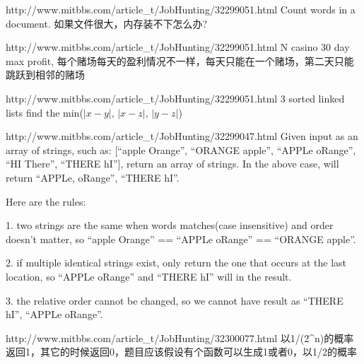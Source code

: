 \documentclass[a4paper]{article}
\begin{document}
\begin{CJK}{UTF8}{gbsn}
\begin{enumerate}
\begin{Q}[Apple]{http://www.mitbbs.com/article_t/JobHunting/32299051.html}
Count words in a document. 如果文件很大，内存装不下怎么办?
\end{Q}

\begin{Q}[Apple]{http://www.mitbbs.com/article_t/JobHunting/32299051.html}
N casino 30 day max profit, 每个赌场每天的盈利情况不一样，每天只能在一个赌场，第二天只能跳跃到相邻的赌场
\end{Q}

\begin{Q}[Apple]{http://www.mitbbs.com/article_t/JobHunting/32299051.html}
3 sorted linked lists find the min($|x-y|$, $|x-z|$, $|y-z|$)
\end{Q}

\begin{Q}{http://www.mitbbs.com/article_t/JobHunting/32299047.html}
Given input as an array of strings, such as: [``apple Orange'', ``ORANGE apple'', ``APPLe oRange'', ``HI There'', ``THERE hI''], return an array of strings. In the above case, will return ``APPLe, oRange'', ``THERE hI''.

Here are the rules:

1. two strings are the same when words matches(case insensitive) and order doesn't matter, so ``apple Orange'' == ``APPLe oRange'' == ``ORANGE apple''.

2. if multiple identical strings exist, only return the one that occurs at the last location, so ``APPLe oRange'' and ``THERE hI'' will in the result.

3.  the relative order cannot be changed, so we cannot have result as ``THERE hI'', ``APPLe oRange''.
\end{Q}

\begin{Q}[Google]{http://www.mitbbs.com/article_t/JobHunting/32300077.html}
以1/(2^n)的概率返回1，其它的时候返回0，题目应该假设有个函数可以生成1或者0，以1/2的概率
\end{Q}

\end{enumerate}
\end{CJK}
\end{document}
